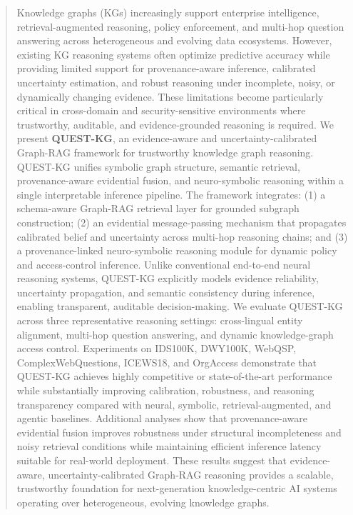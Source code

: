 \documentclass[sigconf,review,anonymous]{acmart}
\begin{document}

\begin{abstract}

Knowledge graphs (KGs) increasingly support enterprise intelligence, retrieval-augmented reasoning, policy enforcement, and multi-hop question answering across heterogeneous and evolving data ecosystems. However, existing KG reasoning systems often optimize predictive accuracy while providing limited support for provenance-aware inference, calibrated uncertainty estimation, and robust reasoning under incomplete, noisy, or dynamically changing evidence. These limitations become particularly critical in cross-domain and security-sensitive environments where trustworthy, auditable, and evidence-grounded reasoning is required.
We present \textbf{QUEST-KG}, an evidence-aware and uncertainty-calibrated Graph-RAG framework for trustworthy knowledge graph reasoning. QUEST-KG unifies symbolic graph structure, semantic retrieval, provenance-aware evidential fusion, and neuro-symbolic reasoning within a single interpretable inference pipeline. The framework integrates: (1) a schema-aware Graph-RAG retrieval layer for grounded subgraph construction; (2) an evidential message-passing mechanism that propagates calibrated belief and uncertainty across multi-hop reasoning chains; and (3) a provenance-linked neuro-symbolic reasoning module for dynamic policy and access-control inference. Unlike conventional end-to-end neural reasoning systems, QUEST-KG explicitly models evidence reliability, uncertainty propagation, and semantic consistency during inference, enabling transparent, auditable decision-making.
We evaluate QUEST-KG across three representative reasoning settings: cross-lingual entity alignment, multi-hop question answering, and dynamic knowledge-graph access control. Experiments on IDS100K, DWY100K, WebQSP, ComplexWebQuestions, ICEWS18, and OrgAccess demonstrate that QUEST-KG achieves highly competitive or state-of-the-art performance while substantially improving calibration, robustness, and reasoning transparency compared with neural, symbolic, retrieval-augmented, and agentic baselines. Additional analyses show that provenance-aware evidential fusion improves robustness under structural incompleteness and noisy retrieval conditions while maintaining efficient inference latency suitable for real-world deployment.
These results suggest that evidence-aware, uncertainty-calibrated Graph-RAG reasoning provides a scalable, trustworthy foundation for next-generation knowledge-centric AI systems operating over heterogeneous, evolving knowledge graphs.

\end{abstract}
\end{document}
